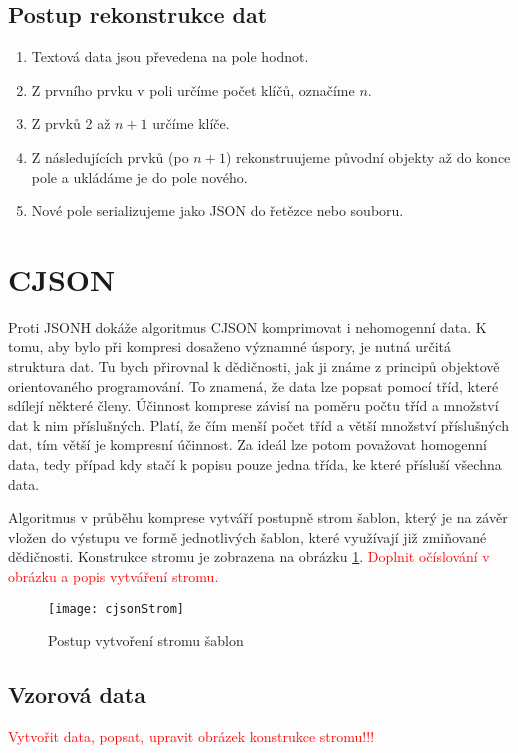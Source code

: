 \subsection{Postup rekonstrukce dat}
\begin{enumerate}
\item Textová data jsou převedena na pole hodnot.
\item Z prvního prvku v poli určíme počet klíčů, označíme $n$.
\item Z prvků 2 až $n+1$ určíme klíče.
\item Z následujících prvků (po $n+1$) rekonstruujeme původní objekty až do konce pole a ukládáme je do pole nového.
\item Nové pole serializujeme jako JSON do řetězce nebo souboru.
\end{enumerate}

\section{CJSON}
Proti JSONH dokáže algoritmus CJSON komprimovat i nehomogenní data. K tomu, aby bylo při kompresi dosaženo významné úspory, je nutná určitá struktura dat. Tu bych přirovnal k dědičnosti, jak ji známe z principů objektově orientovaného programování. To znamená, že data lze popsat pomocí tříd, které sdílejí některé členy. Účinnost komprese závisí na poměru počtu tříd a množství dat k nim příslušných. Platí, že čím menší počet tříd a větší množství příslušných dat, tím větší je kompresní účinnost. Za ideál lze potom považovat homogenní data, tedy případ kdy stačí k popisu pouze jedna třída, ke které přísluší všechna data.

Algoritmus v průběhu komprese vytváří postupně strom šablon, který je na závěr vložen do výstupu ve formě jednotlivých šablon, které využívají již zmiňované dědičnosti. Konstrukce stromu je zobrazena na obrázku \ref{cjsonKonstrukceStromu}. \textcolor{red}{Doplnit očíslování v obrázku a popis vytváření stromu.}

\begin{figure}[!htb]
\centering
\texttt{[image: cjsonStrom]}
\caption{Postup vytvoření stromu šablon}
\label{cjsonKonstrukceStromu}
\end{figure}

\subsection{Vzorová data}
\textcolor{red}{Vytvořit data, popsat, upravit obrázek konstrukce stromu!!!}

